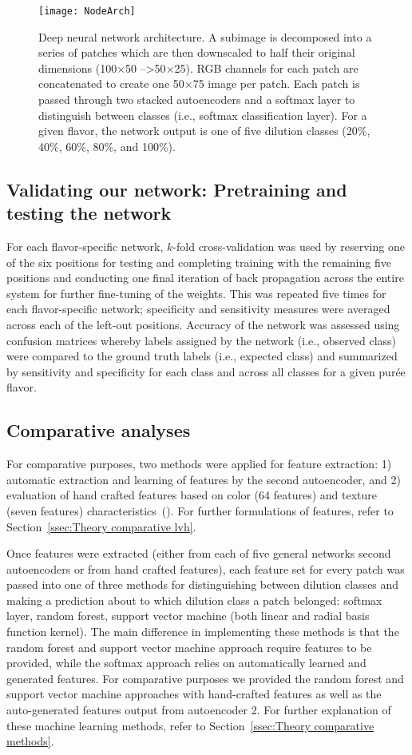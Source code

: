 \documentclass[authoryear]{elsarticle}
\begin{document}
\begin{figure}
\centering
\texttt{[image: NodeArch]}
\caption{Deep neural network architecture. A subimage is decomposed into a series of patches which are then downscaled to half their original dimensions (100$\times$50 --\textgreater 50$\times$25). RGB channels for each patch are concatenated to create one 50$\times$75 image per patch. Each patch is passed through two stacked autoencoders and a softmax layer to distinguish between classes (i.e., softmax classification layer). For a given flavor, the network output is one of five dilution classes (20\%, 40\%, 60\%, 80\%, and 100\%).}
\label{fig:network arch}
\end{figure}\subsection{Validating our network: Pretraining and testing the network}\label{ssec:Validating}
For each flavor-specific network, $k$-fold cross-validation was used by reserving one of the six positions for testing and completing training with the remaining five positions and conducting one final iteration of back propagation across the entire system for further fine-tuning of the weights. This was repeated five times for each flavor-specific network; specificity and sensitivity measures were averaged across each of the left-out positions. Accuracy of the network was assessed using confusion matrices whereby labels assigned by the network (i.e., observed class) were compared to the ground truth labels (i.e., expected class) and summarized by sensitivity and specificity for each class and across all classes for a given pur\' ee flavor.

\subsection{Comparative analyses}\label{ssec:Comparative}
For comparative purposes, two methods were applied for feature extraction: 1) automatic extraction and learning of features by the second autoencoder, and 2) evaluation of hand crafted features based on color (64 features) and texture (seven features) characteristics~(\cite{zhang2012}). For further formulations of features, refer to Section~\ref{ssec:Theory comparative lvh}.

Once features were extracted (either from each of five general networks second autoencoders or from hand crafted features), each feature set for every patch was passed into one of three methods for distinguishing between dilution classes and making a prediction about to which dilution class a patch belonged: softmax layer, random forest, support vector machine (both linear and radial basis function kernel). The main difference in implementing these methods is that the random forest and support vector machine approach require features to be provided, while the softmax approach relies on automatically learned and generated features. For comparative purposes we provided the random forest and support vector machine approaches with hand-crafted features as well as the auto-generated features output from autoencoder 2. For further explanation of these machine learning methods, refer to Section~\ref{ssec:Theory comparative methods}.
\end{document}

